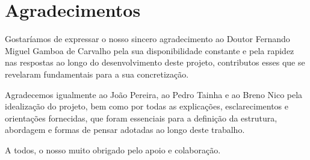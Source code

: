 
\chapter{Agradecimentos}

\noindent Gostaríamos de expressar o nosso sincero agradecimento ao Doutor Fernando Miguel Gamboa de Carvalho pela sua disponibilidade constante e pela rapidez nas respostas ao longo do desenvolvimento deste projeto, contributos esses que se revelaram fundamentais para a sua concretização.

\noindent Agradecemos igualmente ao João Pereira, ao Pedro Tainha e ao Breno Nico pela idealização do projeto, bem como por todas as explicações, esclarecimentos e orientações fornecidas, que foram essenciais para a definição da estrutura, abordagem e formas de pensar adotadas ao longo deste trabalho.

\noindent A todos, o nosso muito obrigado pelo apoio e colaboração.
